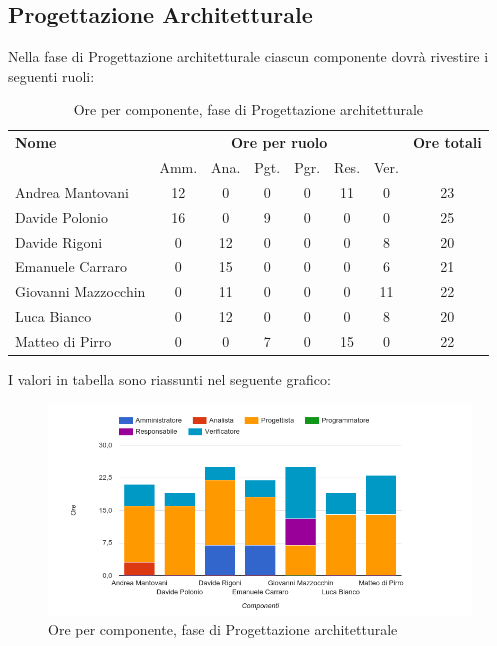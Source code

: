 \pagebreak
\subsection{Progettazione Architetturale}
Nella fase di Progettazione architetturale ciascun componente dovrà rivestire i seguenti ruoli:

\begin{table}[H]
\begin{tabular}{lccccccc}
\toprule
    \textbf{Nome}  & \multicolumn{6}{c}{\textbf{Ore per ruolo}} & \textbf{Ore totali} \\
     & Amm. & Ana. & Pgt. & Pgr. & Res. & Ver. & \\
    \midrule
    
	Andrea Mantovani & 12 & 0 & 0 & 0 & 11 & 0 & 23 \\
	Davide Polonio & 16 & 0 & 9 & 0 & 0 & 0 & 25 \\
	Davide Rigoni & 0 & 12 & 0 & 0 & 0 & 8 & 20 \\
	Emanuele Carraro & 0 & 15 & 0 & 0 & 0 & 6 & 21 \\
	Giovanni Mazzocchin & 0 & 11 & 0 & 0 & 0 & 11 & 22 \\
	Luca Bianco & 0 & 12 & 0 & 0 & 0 & 8 & 20 \\
	Matteo di Pirro & 0 & 0 & 7 & 0 & 15 & 0 & 22 \\
    
    \bottomrule
\end{tabular}
\caption{Ore per componente, fase di Progettazione architetturale}
\end{table}

I valori in tabella sono riassunti nel seguente grafico: \\ 

    \begin{figure}[H]
      \begin{center}
        \includegraphics[width=12cm]{res/img/orePerComponenteProgettazioneArchitetturale.png}
      \caption{Ore per componente, fase di Progettazione architetturale}
      \end{center} 
    \end{figure}    
    
